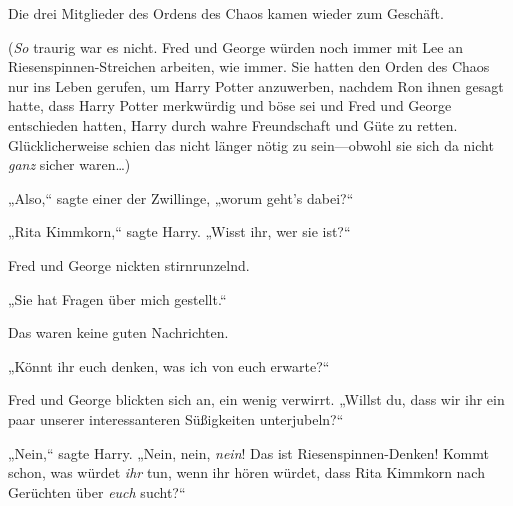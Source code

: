 Die drei Mitglieder des Ordens des Chaos kamen wieder zum Geschäft.

(\emph{So} traurig war es nicht. Fred und George würden noch immer mit Lee an Riesenspinnen-Streichen arbeiten, wie immer. Sie hatten den Orden des Chaos nur ins Leben gerufen, um Harry Potter anzuwerben, nachdem Ron ihnen gesagt hatte, dass Harry Potter merkwürdig und böse sei und Fred und George entschieden hatten, Harry durch wahre Freundschaft und Güte zu retten. Glücklicherweise schien das nicht länger nötig zu sein—obwohl sie sich da nicht \emph{ganz} sicher waren…)

„Also,“ sagte einer der Zwillinge, „worum geht's dabei?“

„Rita Kimmkorn,“ sagte Harry. „Wisst ihr, wer sie ist?“

Fred und George nickten stirnrunzelnd.

„Sie hat Fragen über mich gestellt.“

Das waren keine guten Nachrichten.

„Könnt ihr euch denken, was ich von euch erwarte?“

Fred und George blickten sich an, ein wenig verwirrt. „Willst du, dass wir ihr ein paar unserer interessanteren Süßigkeiten unterjubeln?“

„Nein,“ sagte Harry. „Nein, nein, \emph{nein}! Das ist Riesenspinnen-Denken! Kommt schon, was würdet \emph{ihr} tun, wenn ihr hören würdet, dass Rita Kimmkorn nach Gerüchten über \emph{euch} sucht?“

